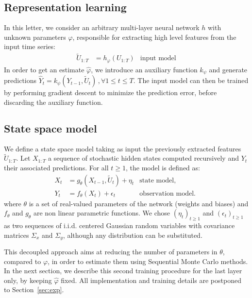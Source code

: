 \documentclass[journal]{IEEEtran}
\begin{document}
\subsection{Representation learning}%
In this letter, we consider an arbitrary multi-layer neural network $h$ with unknown parameters $\varphi$, responsible for extracting high level features from the input time series:
\begin{align*}
	\widetilde U_{1:T} & = h_\varphi(U_{1:T}) & \text{input model}
\end{align*}
In order to get an estimate $\hat \varphi$, we introduce an auxiliary function $k_\psi$ and generate predictions $\hat Y_t = k_\psi(Y_{t-1}, \widetilde U_t)\,, \forall 1 \leq t \leq T$.
The input model can then be trained by performing gradient descent to minimize the prediction error, before discarding the auxiliary function.

\subsection{State space model}
\label{sub:proposed_architecture}
We define a state space model taking as input the previously extracted features $\widetilde U_{1:T}$.
Let $X_{1:T}$ a sequence of stochastic hidden states computed recursively and $Y_t$ their associated predictions.
For all $t \geq 1$, the model is defined as:
\begin{align*}
	X_t & = g_\theta(X_{t-1}, \widetilde U_t) + \eta_t & \text{state model, }       \\
	Y_t & = f_\theta(X_t) + \epsilon_t                 & \text{observation model. }
\end{align*}
where $\theta$ is a set of real-valued parameters of the network (weights and biases) and $f_\theta$ and $g_\theta$ are non linear parametric functions.
We chose $(\eta_t)_{t\geq 1}$ and $(\epsilon_t)_{t\geq 1}$ as two sequences of i.i.d. centered Gaussian random variables with covariance matrices $\Sigma_x$ and $\Sigma_y$, although any distribution can be substituted.

This decoupled approach aims at reducing the number of parameters in $\theta$, compared to $\varphi$, in order to estimate them using Sequential Monte Carlo methods.
In the next section, we describe this second training procedure for the last layer only, by keeping $\hat \varphi$ fixed.
All implementation and training details are postponed to Section~\ref{sec:exp}.
\end{document}

